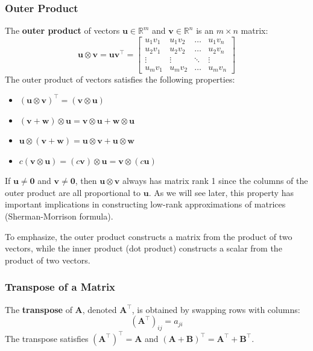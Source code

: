 \subsubsection{Outer Product}
The \textbf{outer product} of vectors $ \mathbf{u} \in \mathbb{R}^m $ and $ \mathbf{v} \in \mathbb{R}^n $ is an $ m \times n $ matrix:
\begin{equation*}
    \mathbf{u}\otimes\mathbf{v} = \mathbf{u} \mathbf{v}^\top = \begin{bmatrix} u_1 v_1 & u_1 v_2 & \ldots & u_1 v_n \\ u_2 v_1 & u_2 v_2 & \ldots & u_2 v_n \\ \vdots & \vdots & \ddots & \vdots \\ u_m v_1 & u_m v_2 & \ldots & u_m v_n \end{bmatrix}
\end{equation*}
The outer product of vectors satisfies the following properties:
\begin{itemize}
    \item $ (\mathbf{u} \otimes \mathbf{v})^\top = (\mathbf{v} \otimes \mathbf{u}) $
    \item $ (\mathbf{v} + \mathbf{w}) \otimes \mathbf{u} = \mathbf{v} \otimes \mathbf{u} + \mathbf{w} \otimes \mathbf{u} $
    \item $ \mathbf{u} \otimes (\mathbf{v} + \mathbf{w}) = \mathbf{u} \otimes \mathbf{v} + \mathbf{u} \otimes \mathbf{w} $
    \item $ c (\mathbf{v} \otimes \mathbf{u}) = (c \mathbf{v}) \otimes \mathbf{u} = \mathbf{v} \otimes (c \mathbf{u}) $
\end{itemize}
If $\mathbf{u} \neq \mathbf{0}$ and $\mathbf{v} \neq \mathbf{0}$, then $\mathbf{u} \otimes \mathbf{v}$ always has matrix rank 1 since the columns of the outer product are all proportional to $\mathbf{u}$. As we will see later, this property has important implications in constructing low-rank approximations of matrices (Sherman-Morrison formula).

To emphasize, the outer product constructs a matrix from the product of two vectors, while the inner product (dot product) constructs a scalar from the product of two vectors.

\subsubsection{Transpose of a Matrix}
The \textbf{transpose} of $ \mathbf{A} $, denoted $ \mathbf{A}^\top $, is obtained by swapping rows with columns:
\begin{equation*}
    (\mathbf{A}^\top)_{ij} = a_{ji}
\end{equation*}
The transpose satisfies $ (\mathbf{A}^\top)^\top = \mathbf{A} $ and $ (\mathbf{A} + \mathbf{B})^\top = \mathbf{A}^\top + \mathbf{B}^\top $.

